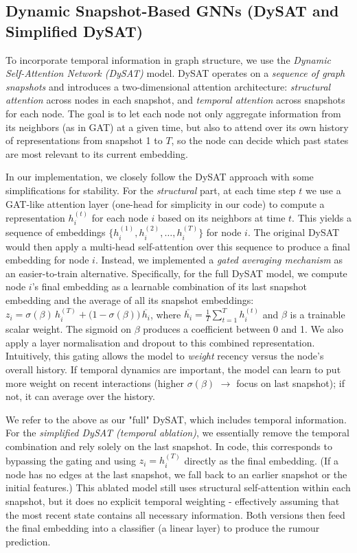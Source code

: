\documentclass{cshonours}
\begin{document}
\subsection{Dynamic Snapshot-Based GNNs (DySAT and Simplified DySAT)}

To incorporate temporal information in graph structure, we use the \emph{Dynamic Self-Attention Network (DySAT)} model. DySAT operates on a \emph{sequence of graph snapshots} and introduces a two-dimensional attention architecture: \emph{structural attention} across nodes in each snapshot, and \emph{temporal attention} across snapshots for each node. The goal is to let each node not only aggregate information from its neighbors (as in GAT) at a given time, but also to attend over its own history of representations from snapshot 1 to $T$, so the node can decide which past states are most relevant to its current embedding.

In our implementation, we closely follow the DySAT approach with some simplifications for stability. For the \emph{structural} part, at each time step $t$ we use a GAT-like attention layer (one-head for simplicity in our code) to compute a representation $h_i^{(t)}$ for each node $i$ based on its neighbors at time $t$. This yields a sequence of embeddings $\{h_i^{(1)}, h_i^{(2)}, \dots, h_i^{(T)}\}$ for node $i$. The original DySAT would then apply a multi-head self-attention over this sequence to produce a final embedding for node $i$. Instead, we implemented a \emph{gated averaging mechanism} as an easier-to-train alternative. Specifically, for the full DySAT model, we compute node $i$'s final embedding as a learnable combination of its last snapshot embedding and the average of all its snapshot embeddings: $z_i = \sigma(\beta)\, h_i^{(T)} + \big(1-\sigma(\beta)\big)\, \overline{h_i}$, where $\overline{h_i} = \frac{1}{T}\sum_{t=1}^T h_i^{(t)}$ and $\beta$ is a trainable scalar weight. The sigmoid on $\beta$ produces a coefficient between 0 and 1. We also apply a layer normalisation and dropout to this combined representation. Intuitively, this gating allows the model to \emph{weight} recency versus the node's overall history. If temporal dynamics are important, the model can learn to put more weight on recent interactions (higher $\sigma(\beta)$ $\rightarrow$ focus on last snapshot); if not, it can average over the history.

We refer to the above as our "full" DySAT, which includes temporal information. For the \emph{simplified DySAT (temporal ablation)}, we essentially remove the temporal combination and rely solely on the last snapshot. In code, this corresponds to bypassing the gating and using $z_i = h_i^{(T)}$ directly as the final embedding. (If a node has no edges at the last snapshot, we fall back to an earlier snapshot or the initial features.) This ablated model still uses structural self-attention within each snapshot, but it does no explicit temporal weighting - effectively assuming that the most recent state contains all necessary information. Both versions then feed the final embedding into a classifier (a linear layer) to produce the rumour prediction.
\end{document}

